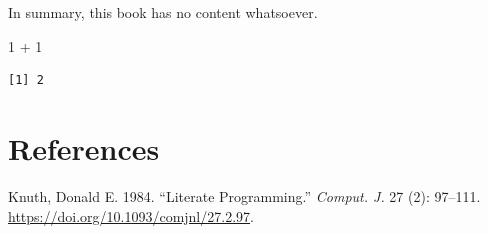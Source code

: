 \documentclass[
  letterpaper,
  DIV=11,
  numbers=noendperiod]{scrreprt}
\newenvironment{Shaded}{\begin{snugshade}}{\end{snugshade}}
\newcommand{\DecValTok}[1]{\textcolor[rgb]{0.68,0.00,0.00}{#1}}
\newcommand{\SpecialCharTok}[1]{\textcolor[rgb]{0.37,0.37,0.37}{#1}}
\newlength{\cslhangindent}
\newenvironment{CSLReferences}[2] %
 {\begin{list}{}{%
  \setlength{\itemindent}{0pt}
  \setlength{\leftmargin}{0pt}
  \setlength{\parsep}{0pt}
  \ifodd #1
   \setlength{\leftmargin}{\cslhangindent}
   \setlength{\itemindent}{-1\cslhangindent}
  \fi
  \setlength{\itemsep}{#2\baselineskip}}}
 {\end{list}}
\theoremstyle{definition}
\theoremstyle{definition}
\theoremstyle{remark}
\begin{document}
In summary, this book has no content whatsoever.

\begin{Shaded}
\begin{Highlighting}[]
\DecValTok{1} \SpecialCharTok{+} \DecValTok{1}
\end{Highlighting}
\end{Shaded}

\begin{verbatim}
[1] 2
\end{verbatim}

\chapter*{References}\label{references}


\label{refs}
\begin{CSLReferences}{1}{0}
Knuth, Donald E. 1984. {``Literate Programming.''} \emph{Comput. J.} 27
(2): 97--111. \url{https://doi.org/10.1093/comjnl/27.2.97}.

\end{CSLReferences}
\end{document}
